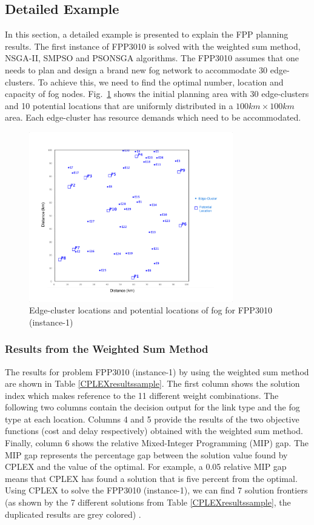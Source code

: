 \documentclass[10pt,journal,compsoc]{IEEEtran}
\newcommand{\Fig}[1]{Fig.~\ref{#1}}
\begin{document}
\subsection{Detailed Example}
In this section, a detailed example is presented to explain the FPP planning results. The first instance of FPP3010 is solved with the weighted sum method, NSGA-II, SMPSO and PSONSGA algorithms. The FPP3010 assumes that one needs to plan and design a brand new fog network to accommodate 30 edge-clusters. To achieve this, we need to find the optimal number, location and capacity of fog nodes. \Fig{nettopology} shows the initial planning area with 30 edge-clusters and 10 potential locations that are uniformly distributed in a $100km \times 100km$ area. 
Each edge-cluster has resource demands which need to be accommodated. 
\begin{figure}[H]
\centerline{\includegraphics[trim=0 30 0 50,clip,width=3.5in]{100x100problem.png}}
\caption{Edge-cluster locations and potential locations of fog for FPP3010 (instance-1)} 
\label{nettopology}
\end{figure}
\subsubsection{Results from the Weighted Sum Method}
The results for problem FPP3010 (instance-1) by using the weighted sum method are shown in Table \ref{CPLEXresultssample}. The first column shows the solution index which makes reference to the 11 different weight combinations. The following two columns contain the decision output for the link type and the fog type at each location. Columns 4 and 5 provide the results of the two objective functions (cost and delay respectively) obtained with the weighted sum method. Finally, column 6 shows the relative Mixed-Integer Programming (MIP) gap. The MIP gap represents the percentage gap between the solution value found by CPLEX and the value of the optimal. For example, a 0.05 relative MIP gap means that CPLEX has found a solution that is five percent from the optimal. Using CPLEX to solve the FPP3010 (instance-1), we can find 7 solution frontiers (as shown by the 7 different solutions from Table \ref{CPLEXresultssample}, the duplicated results are grey colored) . 
\end{document}
